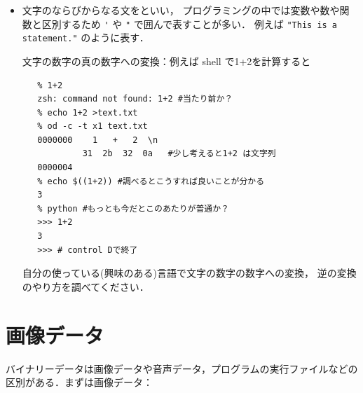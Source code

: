 \begin{itemize}
\begin{Q}
   例えば事務から送られてくるメールでよく文字化けしている
   のUnicode を調べて
   文字化けなく出力出来るようになって下さい．
   \end{Q}
   \begin{Q}
      Windowsなどで未だにSJISを使っている人は早めにUTF-8に移行することを
      お奨めします．やり方を調べて実行してください．
   \end{Q}


   
   \item
   文字のならびからなる文をといい，
   プログラミングの中では変数や数や関数と区別するため  
   \verb/'/ や   \verb/"/ で囲んで表すことが多い．
   例えば \verb/"This is a statement."/ のように表す．
   \begin{Q}
   文字の数字の真の数字への変換：例えば shell で1+2を計算すると
   
   \begin{verbatim}
   % 1+2
   zsh: command not found: 1+2 #当たり前か？
   % echo 1+2 >text.txt 
   % od -c -t x1 text.txt 
   0000000    1   +   2  \n                                                
            31  2b  32  0a   #少し考えると1+2 は文字列
   0000004
   % echo $((1+2)) #調べるとこうすれば良いことが分かる
   3
   % python #もっとも今だとこのあたりが普通か？
   >>> 1+2
   3
   >>> # control Dで終了
\end{verbatim}
   自分の使っている(興味のある)言語で文字の数字の数字への変換，
   逆の変換のやり方を調べてください．
\end{Q}

\end{itemize}
\section{画像データ}
 バイナリーデータは画像データや音声データ，プログラムの実行ファイルなどの区別がある．まずは画像データ：

